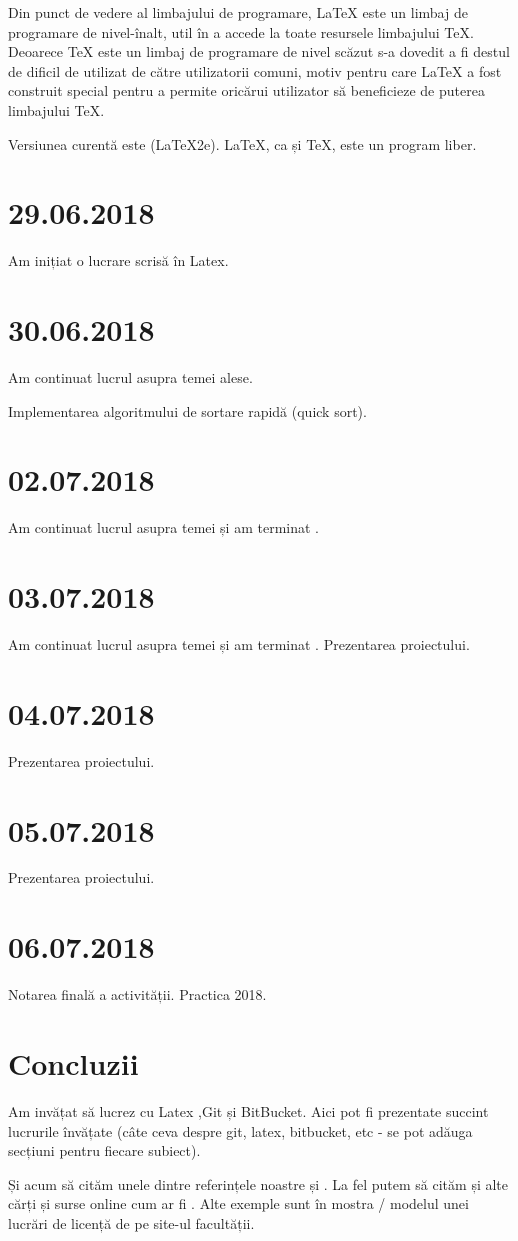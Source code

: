 \documentclass{report}
\begin{document}
Din punct de vedere al limbajului de programare, LaTeX este un limbaj de programare de nivel-înalt, util în a accede la toate resursele limbajului TeX. Deoarece TeX este un limbaj de programare de nivel scăzut s-a dovedit a fi destul de dificil de utilizat de către utilizatorii comuni, motiv pentru care LaTeX a fost construit special pentru a permite oricărui utilizator să beneficieze de puterea limbajului TeX.

Versiunea curentă este (LaTeX2e). LaTeX, ca și TeX, este un program liber.
\newline
\chapter{29.06.2018}
Am inițiat o lucrare scrisă în Latex.
\chapter{30.06.2018}
Am continuat lucrul asupra temei alese.  

\item Implementarea algoritmului de sortare rapidă (quick sort). \newline
\chapter{02.07.2018}
Am continuat lucrul asupra temei și am terminat .
\chapter{03.07.2018}
Am continuat lucrul asupra temei și am terminat .
Prezentarea proiectului.
\chapter{04.07.2018}
Prezentarea proiectului.
\chapter{05.07.2018}
Prezentarea proiectului.
\chapter{06.07.2018}

Notarea finală a activității. Practica 2018.

\chapter{Concluzii}
Am invățat să lucrez cu Latex ,Git și BitBucket. Aici pot fi prezentate succint lucrurile învățate (câte ceva despre git, latex, bitbucket, etc - se pot adăuga secțiuni pentru fiecare subiect). 

Și acum să cităm unele dintre referințele noastre \cite{DUMMY:1} și \cite{book:25008}. La fel putem să cităm și alte cărți și surse online cum ar fi \cite{book:776133, book:1045183}. Alte exemple sunt în mostra / modelul unei lucrări de licență de pe site-ul facultății. 


 

\end{document}
